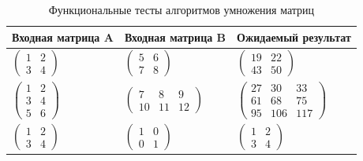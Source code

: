 \begin{table}[h]
	\centering
	\begin{threeparttable}
		\caption{Функциональные тесты алгоритмов умножения матриц}
		\label{tbl:functional_test}
		\begin{tabular}{|p{}|p{}|p{}|}
			\hline
			\textbf{Входная матрица A} & \textbf{Входная матрица B} & \textbf{Ожидаемый результат} \\ 
			\hline
			
			$\begin{pmatrix}
				1 & 2 \\
				3 & 4
			\end{pmatrix}$ &
			$\begin{pmatrix}
				5 & 6 \\
				7 & 8
			\end{pmatrix}$ &
			$\begin{pmatrix}
				19 & 22 \\
				43 & 50
			\end{pmatrix}$ \\
			\hline
			
			$\begin{pmatrix}
				1 & 2 \\
				3 & 4 \\
				5 & 6
			\end{pmatrix}$ &
			$\begin{pmatrix}
				7 & 8 & 9 \\
				10 & 11 & 12
			\end{pmatrix}$ &
			$\begin{pmatrix}
				27 & 30 & 33 \\
				61 & 68 & 75 \\
				95 & 106 & 117
			\end{pmatrix}$ \\
			\hline
			
			$\begin{pmatrix}
				1 & 2 \\
				3 & 4
			\end{pmatrix}$ &
			$\begin{pmatrix}
				1 & 0 \\
				0 & 1
			\end{pmatrix}$ &
			$\begin{pmatrix}
				1 & 2 \\
				3 & 4
			\end{pmatrix}$ \\
			\hline
			

\end{tabular}
\end{threeparttable}
\end{table}
